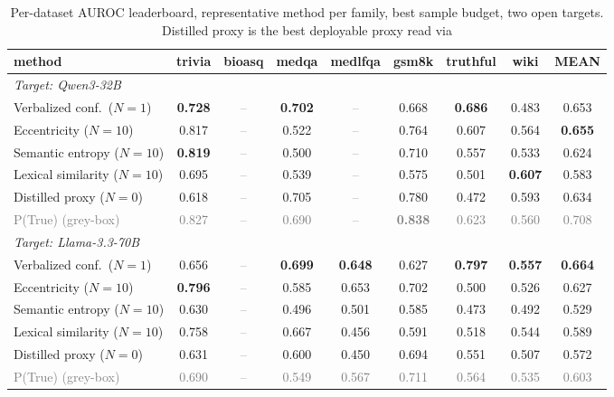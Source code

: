 \documentclass[11pt]{article}
\newcommand{\best}[1]{\textbf{#1}}
\newcommand{\grey}[1]{\textcolor{gray}{#1}}
\begin{document}
\begin{table}[t]\centering\small
\setlength{\tabcolsep}{4pt}
\begin{tabular}{l ccccccc c}
\toprule
method & trivia & bioasq & medqa & medlfqa & gsm8k & truthful & wiki & \best{MEAN}\\
\midrule
\multicolumn{9}{l}{\emph{Target: Qwen3-32B}}\\
Verbalized conf.\ ($N{=}1$)       & \best{0.728} & \grey{--} & \best{0.702} & \grey{--} & 0.668 & \best{0.686} & 0.483 & 0.653\\
Eccentricity ($N{=}10$)           & 0.817 & \grey{--} & 0.522 & \grey{--} & 0.764 & 0.607 & 0.564 & \best{0.655}\\
Semantic entropy ($N{=}10$)       & \best{0.819} & \grey{--} & 0.500 & \grey{--} & 0.710 & 0.557 & 0.533 & 0.624\\
Lexical similarity ($N{=}10$)     & 0.695 & \grey{--} & 0.539 & \grey{--} & 0.575 & 0.501 & \best{0.607} & 0.583\\
Distilled proxy ($N{=}0$)         & 0.618 & \grey{--} & 0.705 & \grey{--} & 0.780 & 0.472 & 0.593 & 0.634\\
\grey{P(True) (grey-box)}         & \grey{0.827} & \grey{--} & \grey{0.690} & \grey{--} & \grey{\best{0.838}} & \grey{0.623} & \grey{0.560} & \grey{0.708}\\
\midrule
\multicolumn{9}{l}{\emph{Target: Llama-3.3-70B}}\\
Verbalized conf.\ ($N{=}1$)       & 0.656 & \grey{--} & \best{0.699} & \best{0.648} & 0.627 & \best{0.797} & \best{0.557} & \best{0.664}\\
Eccentricity ($N{=}10$)           & \best{0.796} & \grey{--} & 0.585 & 0.653 & 0.702 & 0.500 & 0.526 & 0.627\\
Semantic entropy ($N{=}10$)       & 0.630 & \grey{--} & 0.496 & 0.501 & 0.585 & 0.473 & 0.492 & 0.529\\
Lexical similarity ($N{=}10$)     & 0.758 & \grey{--} & 0.667 & 0.456 & 0.591 & 0.518 & 0.544 & 0.589\\
Distilled proxy ($N{=}0$)         & 0.631 & \grey{--} & 0.600 & 0.450 & 0.694 & 0.551 & 0.507 & 0.572\\
\grey{P(True) (grey-box)}         & \grey{0.690} & \grey{--} & \grey{0.549} & \grey{0.567} & \grey{0.711} & \grey{0.564} & \grey{0.535} & \grey{0.603}\\
\bottomrule
\end{tabular}
\caption{Per-dataset AUROC leaderboard, representative method per family, best sample
budget, two open targets. Distilled proxy is the best deployable proxy read via
}
\end{table}
\end{document}
